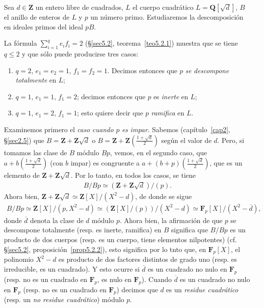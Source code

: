\documentclass[oneside,bibtotoc,leqno,spanish]{amsbook}
\newcommand{\QQ}{\mathbf{Q}}
\newcommand{\ZZ}{\mathbf{Z}}
\newcommand{\FF}{\mathbf{F}}
\newcommand{\oline}[1]{\overline{#1}}
\numberwithin{equation}{section}
\theoremstyle{defi}
\theoremstyle{note}
\theoremstyle{rem}
\numberwithin{theorem}{section}
\numberwithin{proposition}{section}
\numberwithin{definition}{section}
\numberwithin{lemma}{section}
\numberwithin{corollary}{section}
\numberwithin{example}{section}
\numberwithin{footnote}{section}%
\begin{document}
Sea $d\in\ZZ$ un entero libre de cuadrados, $L$ el cuerpo cuadr\'atico $L = \QQ[\sqrt{d}]$,
$B$ el anillo de enteros de $L$ y $p$ un n\'umero primo. Estudiaremos la descomposici\'on en ideales
primos del ideal $pB$.

La f\'ormula $\sum_{i=1}^{q}e_{i}f_{i}=2$ (\S\ref{sec5.2}, teorema~\ref{teo5.2.1}) muestra que se tiene $q\leq 2$ y que
s\'olo puede producirse tres casos:
\begin{enumerate}
\item $q=2$, $e_{1}=e_{2}=1$, $f_{1}=f_{2}=1$. Decimos entonces que $p$ {\em se descompone totalmente}
en $L$;
\item $q=1$, $e_{1}=1$, $f_{1}=2$; decimos entonces que $p$ es {\em inerte} en $L$;
\item $q=1$, $e_{1}=2$, $f_{1}=1$; esto quiere decir que $p$ {\em ramifica} en $L$.
\end{enumerate}
Examinemos primero el {\em caso cuando $p$ es impar.} Sabemos (cap\'itulo~\ref{cap2}, \S\ref{sec2.5}) que
$B = \ZZ+\ZZ\sqrt{d}$ o $B = \ZZ+\ZZ\left(\frac{1+\sqrt{d}}{2}\right)$ seg\'un el valor de $d$. Pero,
si tomamos las clase de $B$ m\'odulo $Bp$, vemos, en el segundo caso, que $a+b\left(\frac{1+\sqrt{d}}{2}\right)$
(con $b$ impar) es congruente a $a+(b+p)\left(\frac{1+\sqrt{d}}{2}\right)$, que es un elemento de
$\ZZ+\ZZ\sqrt{d}$. Por lo tanto, en todos los casos, se tiene
\begin{gather*}
B/Bp\simeq(\ZZ+\ZZ\sqrt{d})/(p).
\end{gather*}
Ahora bien, $\ZZ+\ZZ\sqrt{d}\simeq\ZZ[X]/(X^{2}-d)$, de donde se sigue
\begin{gather*}
B/Bp\simeq\ZZ[X]/(p,X^{2}-d)\simeq(\ZZ[X]/(p))/(X^{2}-d)\simeq\FF_{p}[X]/(X^{2}-\oline d),
\end{gather*}
donde $\oline d$ denota la clase de $d$ m\'odulo $p$. Ahora bien, la afirmaci\'on de que $p$ se
descompone totalmente (resp. es inerte, ramifica) en $B$ significa que $B/Bp$ es un producto de dos cuerpos
(resp. es un cuerpo, tiene elementos nilpotentes) (cf. \S\ref{sec5.2}, proposici\'on~\ref{prop5.2.2}), esto significa por lo tnto que,
en $\FF_{p}[X]$, el polinomio $X^{2}-d$ es producto de dos factores distintos de grado uno (resp.
es irreducible, es un cuadrado). Y esto ocurre si $\oline d$ es un cuadrado no nulo en $\FF_{p}$
(resp. no es un cuadrado en $\FF_{p}$, es nulo en $\FF_{p}$). Cuando $\oline d$ es un cuadrado no nulo
en $\FF_{p}$ (resp. no es un cuadrado en $\FF_{p}$) decimos que $d$ es un {\em residue cuadr\'atico}
(resp. un {\em no residue cuadr\'atico}) m\'odulo $p$.
\end{document}
